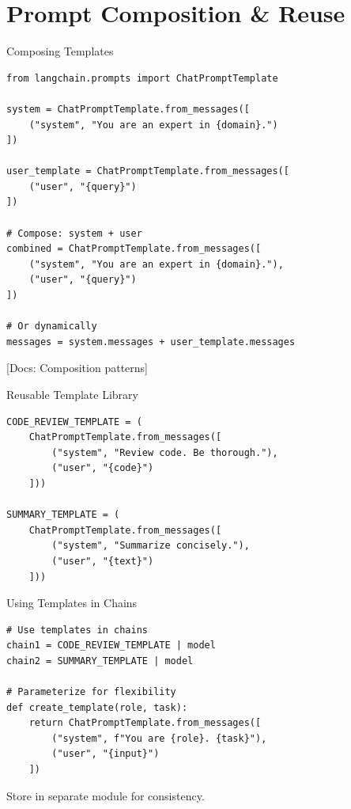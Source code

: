 \documentclass[aspectratio=169,11pt]{beamer}
\newcommand{\docref}[1]{{\scriptsize\color{docgray}[Docs: #1]}}
\begin{document}
\section{Prompt Composition \& Reuse}

\begin{frame}[fragile,shrink=8]{Composing Templates}
  \begin{codebox}
    \begin{lstlisting}
from langchain.prompts import ChatPromptTemplate

system = ChatPromptTemplate.from_messages([
    ("system", "You are an expert in {domain}.")
])

user_template = ChatPromptTemplate.from_messages([
    ("user", "{query}")
])

# Compose: system + user
combined = ChatPromptTemplate.from_messages([
    ("system", "You are an expert in {domain}."),
    ("user", "{query}")
])

# Or dynamically
messages = system.messages + user_template.messages
    \end{lstlisting}
  \end{codebox}
  \vspace{-0.1cm}
  \docref{Composition patterns}
\end{frame}

\begin{frame}[fragile]{Reusable Template Library}
  \begin{codebox}
    \begin{lstlisting}
CODE_REVIEW_TEMPLATE = (
    ChatPromptTemplate.from_messages([
        ("system", "Review code. Be thorough."),
        ("user", "{code}")
    ]))

SUMMARY_TEMPLATE = (
    ChatPromptTemplate.from_messages([
        ("system", "Summarize concisely."),
        ("user", "{text}")
    ]))
    \end{lstlisting}
  \end{codebox}
\end{frame}

\begin{frame}[fragile]{Using Templates in Chains}
  \begin{codebox}
    \begin{lstlisting}
# Use templates in chains
chain1 = CODE_REVIEW_TEMPLATE | model
chain2 = SUMMARY_TEMPLATE | model

# Parameterize for flexibility
def create_template(role, task):
    return ChatPromptTemplate.from_messages([
        ("system", f"You are {role}. {task}"),
        ("user", "{input}")
    ])
    \end{lstlisting}
  \end{codebox}

  \begin{tipbox}[Modularity]
    Store in separate module for consistency.
  \end{tipbox}
\end{frame}
\end{document}
